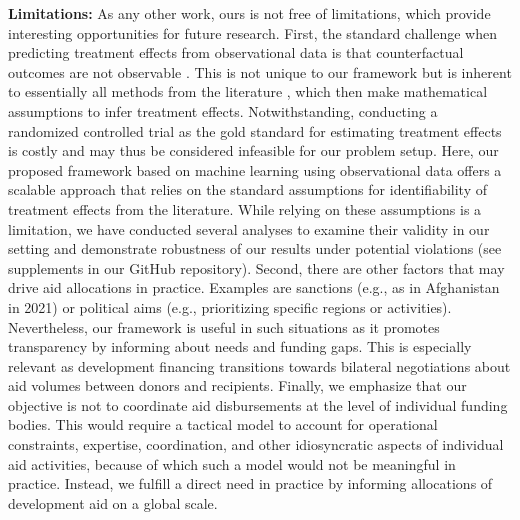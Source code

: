 \documentclass[sigconf]{acmart}
\begin{document}
\textbf{Limitations:} As any other work, ours is not free of limitations, which provide interesting opportunities for future research. First, the standard challenge when predicting treatment effects from observational data is that counterfactual outcomes are not observable \cite{Rubin2005}. This is not unique to our framework but is inherent to essentially all methods from the literature \cite{Schwab2020, Bica2020}, which then make mathematical assumptions to infer treatment effects. Notwithstanding, conducting a randomized controlled trial as the gold standard for estimating treatment effects is costly and may thus be considered infeasible for our problem setup. Here, our proposed framework based on machine learning using observational data offers a scalable approach that relies on the standard assumptions for identifiability of treatment effects from the literature. While relying on these assumptions is a limitation, we have conducted several analyses to examine their validity in our setting and demonstrate robustness of our results under potential violations (see supplements in our GitHub repository).   
Second, there are other factors that may drive aid allocations in practice. Examples are sanctions (e.g., as in Afghanistan in 2021) or political aims (e.g., prioritizing specific regions or activities). Nevertheless, our framework is useful in such situations as it promotes transparency by informing about needs and funding gaps. This is especially relevant as development financing transitions towards bilateral negotiations about aid volumes between donors and recipients. Finally, we emphasize that our objective is not to coordinate aid disbursements at the level of individual funding bodies. This would require a tactical model to account for operational constraints, expertise, coordination, and other idiosyncratic aspects of individual aid activities, because of which such a model would not be meaningful in practice. Instead, we fulfill a direct need in practice \cite{OECDsdglab2022} by informing allocations of development aid on a global scale.

\end{document}
